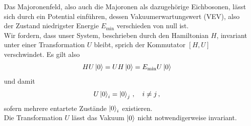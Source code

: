 Das Majoronenfeld, also auch die Majoronen als dazugehörige Eichbosonen, lässt sich durch ein Potential einführen, dessen Vakuumerwartungswert (VEV), also der Zustand niedrigster Energie $E_\text{min}$ verschieden von null ist. \\
Wir fordern, dass unser System, beschrieben durch den Hamiltonian $H$, invariant unter einer Transformation $U$ bleibt, sprich der Kommutator $[H, U]$ verschwindet.
Es gilt also
\begin{equation*}
    H U \ket{0} = U H \ket{0} = E_\text{min} U  \ket{0} 
\end{equation*}
und damit
\begin{equation*}
    U \ket{0}_i = \ket{0}_j \,, \quad i \neq j \,,
\end{equation*}
sofern mehrere entartete Zustände $\ket{0}_i$ existieren. \\
Die Transformation $U$ lässt das Vakuum $\ket{0}$ nicht notwendigerweise invariant.

